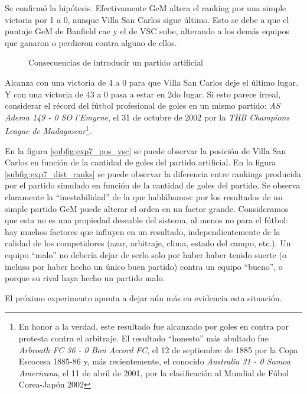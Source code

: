 \par Se confirmó la hipótesis. Efectivamente GeM altera el ranking por una
simple victoria por 1 a 0, aunque Villa San Carlos sigue último. Esto se debe a
que el puntaje GeM de Banfield cae y el de VSC sube, alterando a los demás
equipos que ganaron o perdieron contra alguno de ellos.

\begin{figure}[H]
    \centering
    \hspace{2pt}
    \caption{Consecuencias de introducir un partido artificial}
\end{figure}

\par Alcanza con una victoria de 4 a 0 para que Villa San Carlos deje el último
lugar. Y con una victoria de 43 a 0 pasa a estar en 2do lugar. Si esto parece
irreal, considerar el récord del fútbol profesional de goles en un mismo
partido: \emph{AS Adema 149 - 0 SO l'Emyrne}, el 31 de octubre de 2002 por la
\emph{THB Champions League de Madagascar}\footnote{En honor a la verdad, este
resultado fue alcanzado por goles en contra por protesta contra el arbitraje.
El resultado ``honesto'' más abultado fue \emph{Arbroath FC 36 - 0 Bon Accord
FC}, el 12 de septiembre de 1885 por la Copa Escocesa 1885-86 y, más
recientemente, el conocido \emph{Australia 31 - 0 Samoa Americana}, el 11 de
abril de 2001, por la clasificación al Mundial de Fúbol Corea-Japón 2002}.

\par En la figura \ref{subfig:exp7_pos_vsc} se puede observar la posición de
Villa San Carlos en función de la cantidad de goles del partido artificial. En
la figura \ref{subfig:exp7_dist_ranks} se puede observar la diferencia entre
rankings producida por el partido simulado en función de la cantidad de goles
del partido. Se observa claramente la ``inestabilidad'' de la que hablábamos:
por los resultados de un simple partido GeM puede alterar el orden en un factor
grande. Consideramos que esta no es una propiedad deseable del sistema, al
menos no para el fútbol: hay muchos factores que influyen en un resultado,
independientemente de la calidad de los competidores (azar, arbitraje, clima,
estado del campo, etc.). Un equipo ``malo'' no debería dejar de serlo solo por
haber haber tenido suerte (o incluso por haber hecho un único buen partido)
contra un equipo ``bueno'', o porque su rival haya hecho un partido malo.

\par El próximo experimento apunta a dejar aún más en evidencia esta situación.
